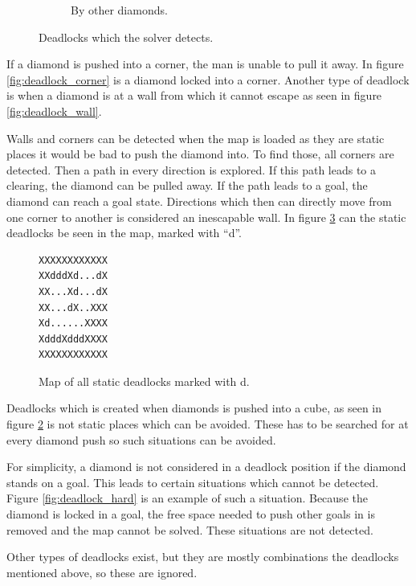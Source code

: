 \begin{figure}[h]
\begin{subfigure}{0.3\textwidth}
  \caption{By other diamonds.}
  \label{fig:deadlock_diamond}
\end{subfigure}
\caption{Deadlocks which the solver detects.}
\end{figure}

If a diamond is pushed into a corner, the man is unable to pull it away.
In figure \ref{fig:deadlock_corner} is a diamond locked into a corner.
Another type of deadlock is when a diamond is at a wall from which it cannot escape as seen in figure \ref{fig:deadlock_wall}.

Walls and corners can be detected when the map is loaded as they are static places it would be bad to push the diamond into.
To find those, all corners are detected.
Then a path in every direction is explored. 
If this path leads to a clearing, the diamond can be pulled away.
If the path leads to a goal, the diamond can reach a goal state.
Directions which then can directly move from one corner to another is considered an inescapable wall.
In figure \ref{fig:static_deadlocks} can the static deadlocks be seen in the map, marked with ``d''.

\begin{figure}[h]
 \centering
 \begin{minipage}{0.1\textwidth}
\begin{verbatim}
XXXXXXXXXXXX
XXdddXd...dX
XX...Xd...dX
XX...dX..XXX
Xd......XXXX
XdddXdddXXXX
XXXXXXXXXXXX
\end{verbatim}
 \end{minipage}
 \caption{Map of all static deadlocks marked with d.}
 \label{fig:static_deadlocks}
\end{figure}

Deadlocks which is created when diamonds is pushed into a cube, as seen in figure \ref{fig:deadlock_diamond} is not static places which can be avoided.
These has to be searched for at every diamond push so such situations can be avoided.

For simplicity, a diamond is not considered in a deadlock position if the diamond stands on a goal.
This leads to certain situations which cannot be detected.
Figure \ref{fig:deadlock_hard} is an example of such a situation.
Because the diamond is locked in a goal, the free space needed to push other goals in is removed and the map cannot be solved.
These situations are not detected.

Other types of deadlocks exist, but they are mostly combinations the deadlocks mentioned above, so these are ignored.

